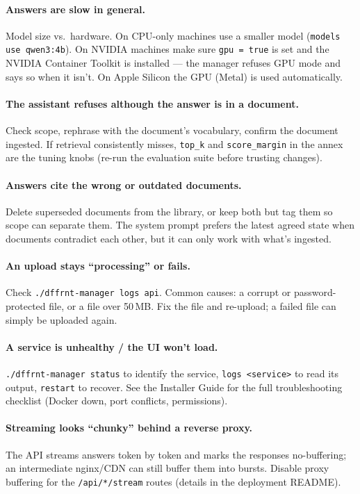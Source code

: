 \documentclass[11pt,letterpaper]{article}
\begin{document}
\paragraph{Answers are slow in general.}
Model size vs.\ hardware. On CPU-only machines use a smaller model
(\texttt{models use qwen3:4b}). On NVIDIA machines make sure
\texttt{gpu = true} is set and the NVIDIA Container Toolkit is installed ---
the manager refuses GPU mode and says so when it isn't. On Apple Silicon the
GPU (Metal) is used automatically.

\paragraph{The assistant refuses although the answer is in a document.}
Check scope, rephrase with the document's vocabulary, confirm the document
ingested. If retrieval consistently misses, \texttt{top\_k} and
\texttt{score\_margin} in the annex are the tuning knobs (re-run the
evaluation suite before trusting changes).

\paragraph{Answers cite the wrong or outdated documents.}
Delete superseded documents from the library, or keep both but tag them so
scope can separate them. The system prompt prefers the latest agreed state
when documents contradict each other, but it can only work with what's
ingested.

\paragraph{An upload stays ``processing'' or fails.}
Check \texttt{./dffrnt-manager logs api}. Common causes: a corrupt or
password-protected file, or a file over 50\,MB. Fix the file and re-upload;
a failed file can simply be uploaded again.

\paragraph{A service is unhealthy / the UI won't load.}
\texttt{./dffrnt-manager status} to identify the service,
\texttt{logs <service>} to read its output, \texttt{restart} to recover. See
the Installer Guide for the full troubleshooting checklist (Docker down,
port conflicts, permissions).

\paragraph{Streaming looks ``chunky'' behind a reverse proxy.}
The API streams answers token by token and marks the responses no-buffering;
an intermediate nginx/CDN can still buffer them into bursts. Disable proxy
buffering for the \texttt{/api/*/stream} routes (details in the deployment
README).
\end{document}
